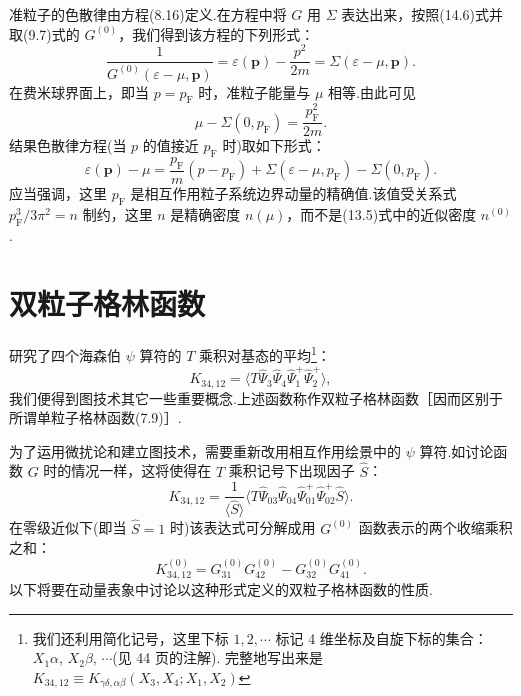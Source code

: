 准粒子的色散律由方程(8.16)定义.在方程中将 $G$ 用 $\Sigma$ 表达出来，按照(14.6)式并取(9.7)式的 $G^{(0)}$，我们得到该方程的下列形式：
\begin{equation}
  \frac{1}{G^{(0)}(\varepsilon-\mu,\bm{p})}=\varepsilon(\bm{p})-\frac{p^2}{2m}=\Sigma(\varepsilon-\mu,\bm{p}).
\end{equation}
在费米球界面上，即当 $p=p_{\mathrm{F}}$ 时，准粒子能量与 $\mu$ 相等.由此可见
\begin{equation}
  \mu-\Sigma(0,p_{\mathrm{F}})=\frac{p_{\mathrm{F}}^2}{2m}.
\end{equation}
结果色散律方程(当 $p$ 的值接近 $p_{\mathrm{F}}$ 时)取如下形式：
\begin{equation}
  \varepsilon(\bm{p})-\mu=\frac{p_{\mathrm{F}}}{m}(p-p_{\mathrm{F}})
  +\Sigma(\varepsilon-\mu,p_{\mathrm{F}})-\Sigma(0,p_{\mathrm{F}}).
\end{equation}
应当强调，这里 $p_{\mathrm{F}}$ 是相互作用粒子系统边界动量的精确值.该值受关系式 $p_{\mathrm{F}}^3/3\pi^2=n$ 制约，这里 $n$ 是精确密度 $n(\mu)$，而不是(13.5)式中的近似密度 $n^{(0)}$.

\section{双粒子格林函数}

研究了四个海森伯 $\psi$ 算符的 $T$ 乘积对基态的平均\footnote{我们还利用简化记号，这里下标 $1,2,\cdots$ 标记 4 维坐标及自旋下标的集合：$X_1\alpha$, $X_2\beta$, $\cdots$(见 44 页的注解). 完整地写出来是 $K_{34,12}\equiv K_{\gamma\delta,\alpha\beta}(X_3,X_4;X_1,X_2)$}：
\begin{equation}
  K_{34,12}=\langle T\hat{\Psi}_3\hat{\Psi}_4\hat{\Psi}^{+}_1\hat{\Psi}^{+}_2\rangle,
\end{equation}
我们便得到图技术其它一些重要概念.上述函数称作双粒子格林函数［因而区别于所谓单粒子格林函数(7.9)］.

为了运用微扰论和建立图技术，需要重新改用相互作用绘景中的 $\psi$ 算符.如讨论函数 $G$ 时的情况一样，这将使得在 $T$ 乘积记号下出现因子 $\hat{S}$：
\begin{equation}
  K_{34,12}=\frac{1}{\langle\hat{S}\rangle}
  \langle T\hat{\Psi}_{03}\hat{\Psi}_{04}\hat{\Psi}^{+}_{01}\hat{\Psi}^{+}_{02}\hat{S}\rangle.
\end{equation}
在零级近似下(即当 $\hat{S}=1$ 时)该表达式可分解成用 $G^{(0)}$ 函数表示的两个收缩乘积之和：
\begin{equation}
  K^{(0)}_{34,12}=G^{(0)}_{31}G^{(0)}_{42}-G^{(0)}_{32}G^{(0)}_{41}.
\end{equation}
以下将要在动量表象中讨论以这种形式定义的双粒子格林函数的性质.

